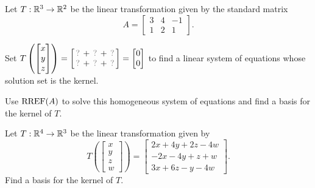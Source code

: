 \begin{activity}{10}
Let $T: \mathbb{R}^3 \rightarrow \mathbb{R}^2$ be the linear transformation given by the
standard matrix
\[A=\begin{bmatrix} 3 & 4 & -1 \\ 1 & 2 & 1 \end{bmatrix}.\]
\begin{subactivity}
Set
\(
  T\left(\begin{bmatrix}x\\y\\z\end{bmatrix}\right)
    =
  \begin{bmatrix}
    \unknown+\unknown+\unknown \\
    \unknown+\unknown+\unknown
  \end{bmatrix}
    =
  \begin{bmatrix}0\\0\end{bmatrix}
\) to find a linear system of equations whose solution set is the kernel.
\end{subactivity}
\begin{subactivity}
Use $\operatorname{RREF}(A)$ to solve this homogeneous system of equations and find a basis
for the kernel of \(T\).
\end{subactivity}
\end{activity}

\begin{activity}{10}
Let \(T: \mathbb{R}^4 \rightarrow \mathbb{R}^3\) be the linear transformation given by 
\[ T\left(\begin{bmatrix} x \\ y \\ z \\ w \end{bmatrix} \right) = 
\begin{bmatrix} 2x+4y+2z-4w \\ -2x-4y+z+w \\ 3x+6z-y-4w\end{bmatrix}.\]
\vfill
Find a basis for the kernel of \(T\).
\end{activity}

